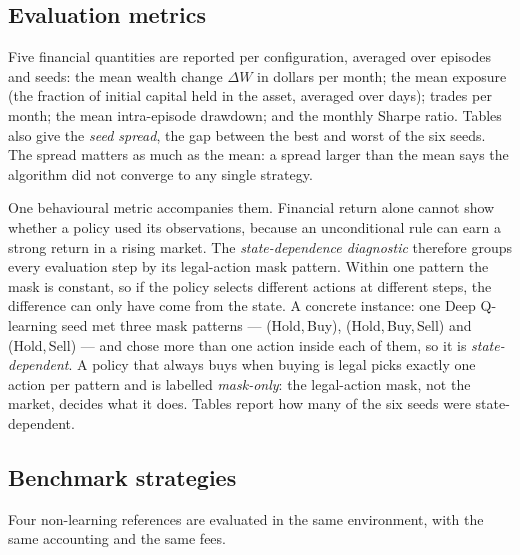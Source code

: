 \subsection{Evaluation metrics}

Five financial quantities are reported per configuration, averaged over
episodes and seeds: the mean wealth change $\Delta W$ in dollars per month;
the mean exposure (the fraction of initial capital held in the asset,
averaged over days); trades per month; the mean intra-episode drawdown; and
the monthly Sharpe ratio. Tables also give the \emph{seed spread}, the gap
between the best and worst of the six seeds. The spread matters as much as
the mean: a spread larger than the mean says the algorithm did not converge
to any single strategy.

One behavioural metric accompanies them. Financial return alone cannot show
whether a policy used its observations, because an unconditional rule can
earn a strong return in a rising market. The \emph{state-dependence
diagnostic} therefore groups every evaluation step by its legal-action mask
pattern. Within one pattern the mask is constant, so if the policy selects
different actions at different steps, the difference can only have come from
the state. A concrete instance: one Deep Q-learning seed met three mask
patterns --- (Hold,\,Buy), (Hold,\,Buy,\,Sell) and (Hold,\,Sell) --- and
chose more than one action inside each of them, so it is
\emph{state-dependent}. A policy that always buys when buying is legal picks
exactly one action per pattern and is labelled \emph{mask-only}: the legal-action
mask, not the market, decides what it does. Tables report how many of the
six seeds were state-dependent.

\subsection{Benchmark strategies}

Four non-learning references are evaluated in the same environment, with the
same accounting and the same fees.

